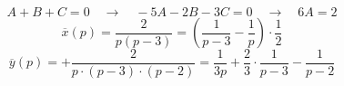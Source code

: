 \documentclass{article}
\begin{document}
        $$A + B + C = 0 \quad\rightarrow\quad -5A - 2B - 3C = 0  \quad\rightarrow\quad 6A = 2$$
        $$\overline{x}(p) = \frac{2}{p(p - 3)} = \left(\frac{1}{p - 3} - \frac{1}{p}\right) \cdot \frac{1}{2}$$
        $$\overline{y}(p) = + \frac{2}{p\cdot(p - 3)\cdot (p - 2)} = \frac{1}{3p} + \frac{2}{3} \cdot \frac{1}{p - 3} - \frac{1}{p - 2} $$
      

        
        
        
\end{document}
